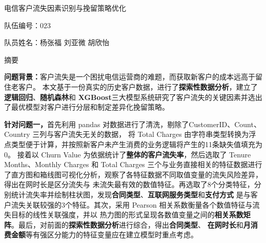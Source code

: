 \documentclass[12pt,a4paper]{ctexart}
\newcommand{\teamNumber}{023}
\newcommand{\teamMembers}{杨张福 \quad 刘亚微 \quad 胡欣怡}
\newcommand{\paperTitle}{电信客户流失因素识别与挽留策略优化}
\begin{document}
\begin{titlepage}
\thispagestyle{empty}
\begin{center}
    \vspace*{2cm}

    {\heiti{} \paperTitle}

    \vspace{3cm}

    {\songti{}
    队伍编号：\teamNumber

    \vspace{0.5cm}

    队员姓名：\teamMembers

    \vspace{3cm}

    }

    \vfill
\end{center}
\end{titlepage}

\setcounter{page}{1}
\pagestyle{fancy}

\begin{center}
    {\heiti{} 摘\quad 要}
\end{center}

\vspace{1em}
\textbf{问题背景：}客户流失是一个困扰电信运营商的难题，而获取新客户的成本远高于留住老客户。
本文基于一份真实的历史客户数据，进行了\textbf{探索性数据分析}，建立了\textbf{逻辑回归}、\textbf{随机森林}和
\textbf{XGBoost}三大模型系统研究了客户流失的关键因素并选出了最优模型对客户进行分层和制定差异化挽留策略。

\textbf{针对问题一，}首先利用 pandas 对数据进行了清洗，剔除了CustomerID、Count、Country 三列与客户流失无关的数据，
将 Total Charges 由字符串类型转换为浮点类型便于计算，并按照新客户未产生消费的业务逻辑将产生的11条缺失值填充为0。
接着以 Churn Value 为依据统计了\textbf{整体的客户流失率}，然后选取了 Tenure Months、Monthly Charges 和 Total Charges
三个与业务直接相关的特征数据进行了直方图和箱线图可视化分析，观察了各特征数据不同取值变量的流失风险差异，得出在网时长是区分流失与
未流失最有效的数值特征。再选取了$8$个分类特征，分别统计流失率并绘制柱状图，发现\textbf{合同类型}、\textbf{互联网服务类型}和\textbf{支付方式}
是与客户流失关联较强的$3$个特征。其次，采用 Pearson 相关系数衡量各个数值特征与流失目标的线性关联强度，并以
热力图的形式呈现各数值变量之间的\textbf{相关系数矩阵}。最后，对前面的\textbf{探索性数据分析}进行综合，得出\textbf{合同类型}、
\textbf{在网时长}和\textbf{月消费金额}等有强区分能力的特征变量应在建立模型时重点考虑。
\end{document}
